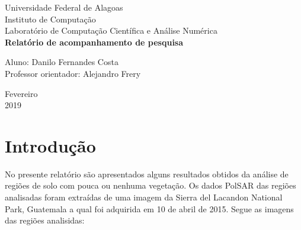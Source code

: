 \documentclass[12pt]{article}
\begin{document}

\onehalfspacing

\begin{titlepage}
	\begin{center}

		\Huge{Universidade Federal de Alagoas}\\
		\large{Instituto de Computação}\\ 
		\large{Laboratório de Computação Científica e Análise Numérica}\\ 
        \vspace{220pt}
        \textbf{\LARGE{Relatório de acompanhamento de pesquisa}}\\
		\vspace{3,5cm}
	\end{center}
	
	\begin{flushleft}
		\begin{tabbing}
			Aluno: Danilo Fernandes Costa\\
			Professor orientador: Alejandro Frery\\
	\end{tabbing}
 \end{flushleft}
	\vspace{1cm}
	
	\begin{center}
		\vspace{\fill}
			 Fevereiro\\
		 2019
			\end{center}
\end{titlepage}

\section{Introdução}

No presente relatório são apresentados alguns resultados obtidos da análise de regiões de solo com pouca ou nenhuma vegetação. Os dados PolSAR das regiões analisadas foram extraídas de uma imagem da Sierra del Lacandon National Park, Guatemala a qual foi adquirida em 10 de abril de 2015. Segue as imagens das regiões analisidas:
\end{document}
